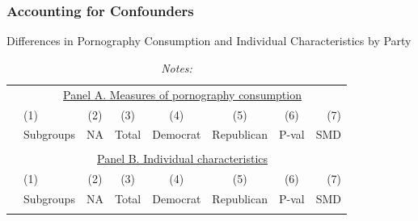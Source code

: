 \documentclass[12pt, letterpaper]{article}
\begin{document}
\subsubsection{Accounting for Confounders}\label{si:confounders}
\begin{table}[ht] \centering \small \setlength\tabcolsep{5 pt}
	\caption{Differences in Pornography Consumption and Individual Characteristics by Party}
	\label{tab:characteristics_split_by_party}
	\begin{adjustbox}{max width=\textwidth}
		\begin{tabular}{@{\hspace{0\tabcolsep}}llrcccrr@{\hspace{0\tabcolsep}}}
			\toprule
			&\multicolumn{7}{c}{\underline{Panel A. Measures of pornography consumption}}\\
			&\multicolumn{1}{l}{(1)}&\multicolumn{1}{c}{(2)}&\multicolumn{1}{c}{(3)}&\multicolumn{1}{c}{(4)}&\multicolumn{1}{c}{(5)}&\multicolumn{1}{c}{(6)}&\multicolumn{1}{r}{(7)}\\			
			&\multicolumn{1}{l}{Subgroups}&\multicolumn{1}{c}{NA}&\multicolumn{1}{c}{Total}&\multicolumn{1}{c}{Democrat}&\multicolumn{1}{c}{Republican}&\multicolumn{1}{c}{P-val}&\multicolumn{1}{r}{SMD}\\
			\cmidrule{2-8}
			\\
			\cmidrule{2-8}
			&\multicolumn{7}{c}{\underline{Panel B. Individual characteristics}}\\
			&\multicolumn{1}{l}{(1)}&\multicolumn{1}{c}{(2)}&\multicolumn{1}{c}{(3)}&\multicolumn{1}{c}{(4)}&\multicolumn{1}{c}{(5)}&\multicolumn{1}{c}{(6)}&\multicolumn{1}{r}{(7)}\\			
			&\multicolumn{1}{l}{Subgroups}&\multicolumn{1}{c}{NA}&\multicolumn{1}{c}{Total}&\multicolumn{1}{c}{Democrat}&\multicolumn{1}{c}{Republican}&\multicolumn{1}{c}{P-val}&\multicolumn{1}{r}{SMD}\\
			\cmidrule{2-8}
			\\
			\bottomrule
		\end{tabular}
	\end{adjustbox}
	\caption*{\scriptsize \emph{Notes:}
}
\end{table}
\end{document}

